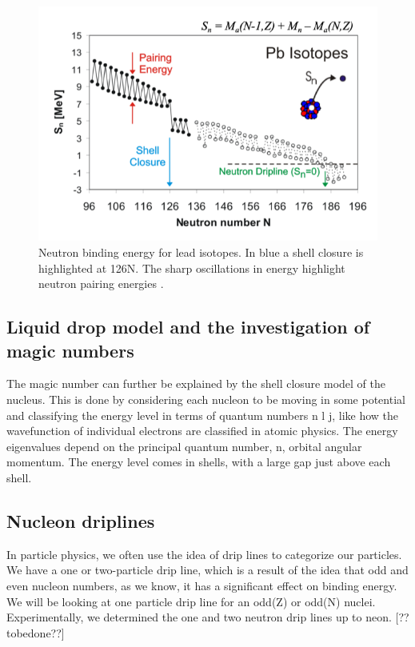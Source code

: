 \begin{figure}[H]
    \centering
    \includegraphics[width=.5\textwidth]{images/NMMwrtNFT_zigzag.png}
    \caption{Neutron binding energy for lead isotopes. In blue a shell closure is highlighted at 126N. The sharp oscillations in energy highlight neutron pairing energies \cite{noauthor_nuclear_nodate}.}\label{fig:MSaNFTzigzag}
\end{figure}

\subsection{Liquid drop model and the investigation of magic numbers}
The magic number can further be explained by the shell closure model of the nucleus.
This is done by considering each nucleon to be moving in some potential and classifying the energy level in terms of quantum numbers n l j, like how the wavefunction of individual electrons are classified in atomic physics.
The energy eigenvalues depend on the principal quantum number, n, orbital angular momentum.
The energy level comes in shells, with a large gap just above each shell. \cite{smolanczuk_particle}

\subsection{Nucleon driplines}
In particle physics, we often use the idea of drip lines to categorize our particles.
We have a one or two-particle drip line, which is a result of the idea that odd and even nucleon numbers, as we know, it has a significant effect on binding energy.
We will be looking at one particle drip line for an odd(Z) or odd(N) nuclei.
Experimentally, we determined the one and two neutron drip lines up to neon. [??tobedone??]